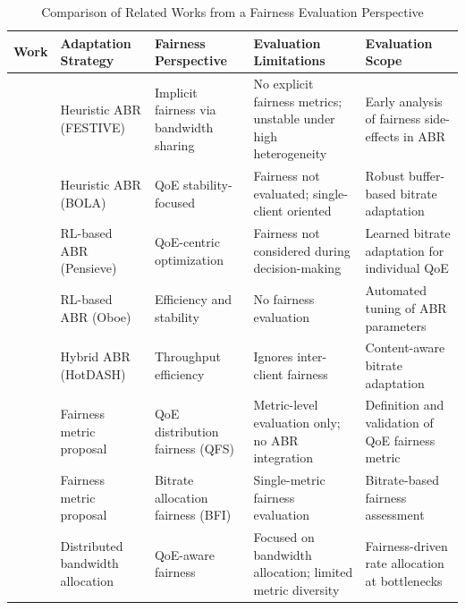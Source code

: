 \documentclass[conference,a4paper]{IEEEtran}
\begin{document}
    \begin{table}[t]
        \centering
        \caption{Comparison of Related Works from a Fairness Evaluation Perspective}
        \label{tab:comparison_related_works}
        \scriptsize
        \begin{tabular}{|p{0.6cm}|p{2.9cm}|p{3.2cm}|p{4.6cm}|p{4.6cm}|}
        \hline
        \textbf{Work} & \textbf{Adaptation Strategy} & \textbf{Fairness Perspective} & \textbf{Evaluation Limitations} & \textbf{Evaluation Scope} \\
        \hline
        \cite{jiang2012improving} & Heuristic ABR (FESTIVE) & Implicit fairness via bandwidth sharing & No explicit fairness metrics; unstable under high heterogeneity & Early analysis of fairness side-effects in ABR \\
        
        \cite{spiteri2020bola} & Heuristic ABR (BOLA) & QoE stability-focused & Fairness not evaluated; single-client oriented & Robust buffer-based bitrate adaptation \\
        
        \cite{mao2017neural} & RL-based ABR (Pensieve) & QoE-centric optimization & Fairness not considered during decision-making & Learned bitrate adaptation for individual QoE \\
        
        \cite{akhtar2018oboe} & RL-based ABR (Oboe) & Efficiency and stability & No fairness evaluation & Automated tuning of ABR parameters \\
        
        \cite{hotdash2018} & Hybrid ABR (HotDASH) & Throughput efficiency & Ignores inter-client fairness & Content-aware bitrate adaptation \\
        
        \cite{hossfeld2018new} & Fairness metric proposal & QoE distribution fairness (QFS) & Metric-level evaluation only; no ABR integration & Definition and validation of QoE fairness metric \\
        
        \cite{li2023achieving} & Fairness metric proposal & Bitrate allocation fairness (BFI) & Single-metric fairness evaluation & Bitrate-based fairness assessment \\
        
        \cite{liu2022qoe-fairness} & Distributed bandwidth allocation & QoE-aware fairness & Focused on bandwidth allocation; limited metric diversity & Fairness-driven rate allocation at bottlenecks \\
        

\end{tabular}
\end{table}
\end{document}
